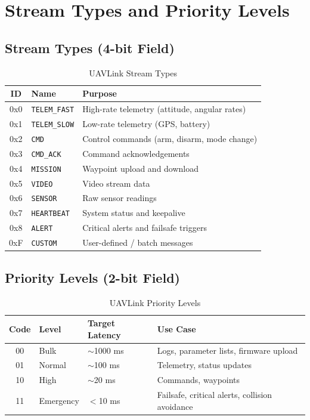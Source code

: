 \documentclass[11pt,a4paper]{article}
\begin{document}
\newpage
\section{Stream Types and Priority Levels}

\subsection{Stream Types (4-bit Field)}
\label{sec:streams}

\begin{table}[H]
\centering
\begin{tabular}{@{}cll@{}}
\toprule
\textbf{ID} & \textbf{Name} & \textbf{Purpose} \\
\midrule
0x0 & \texttt{TELEM\_FAST}  & High-rate telemetry (attitude, angular rates) \\
0x1 & \texttt{TELEM\_SLOW}  & Low-rate telemetry (GPS, battery) \\
0x2 & \texttt{CMD}          & Control commands (arm, disarm, mode change) \\
0x3 & \texttt{CMD\_ACK}     & Command acknowledgements \\
0x4 & \texttt{MISSION}      & Waypoint upload and download \\
0x5 & \texttt{VIDEO}        & Video stream data \\
0x6 & \texttt{SENSOR}       & Raw sensor readings \\
0x7 & \texttt{HEARTBEAT}    & System status and keepalive \\
0x8 & \texttt{ALERT}        & Critical alerts and failsafe triggers \\
0xF & \texttt{CUSTOM}       & User-defined / batch messages \\
\bottomrule
\end{tabular}
\caption{UAVLink Stream Types}
\end{table}

\subsection{Priority Levels (2-bit Field)}
\label{sec:priority}

\begin{table}[H]
\centering
\begin{tabular}{@{}clll@{}}
\toprule
\textbf{Code} & \textbf{Level} & \textbf{Target Latency} & \textbf{Use Case} \\
\midrule
00 & Bulk      & $\sim$1000 ms & Logs, parameter lists, firmware upload \\
01 & Normal    & $\sim$100 ms  & Telemetry, status updates \\
10 & High      & $\sim$20 ms   & Commands, waypoints \\
11 & Emergency & $<$10 ms      & Failsafe, critical alerts, collision avoidance \\
\bottomrule
\end{tabular}
\caption{UAVLink Priority Levels}
\end{table}
\end{document}
